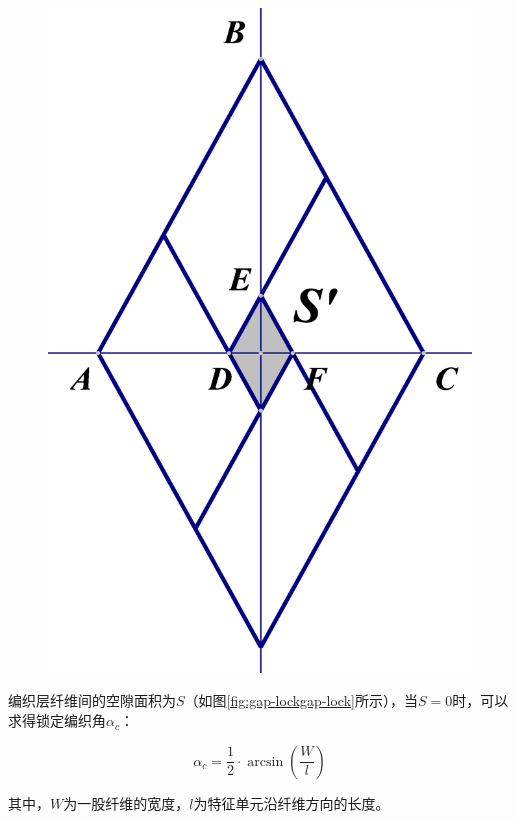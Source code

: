 \begin{figure}[!htb]
{		\includegraphics[height=0.2\textheight]{figure/experiment/hachemi-hyper-2}
		\label{fig:hachemi-hyper-2}
	}
	\label{fig:hachemi-hyper}
\end{figure}

编织层纤维间的空隙面积为$ S $（如图\ref{fig:gap-lockgap-lock}所示），当$ S = 0 $时，可以求得锁定编织角$ \alpha_c $：

\begin{equation}
{\alpha _c} = \frac{1}{2} \cdot \arcsin \left( {\frac{W}{l}} \right)
\end{equation}

\newpage
其中，$ W $为一股纤维的宽度，$ l  $为特征单元沿纤维方向的长度。

